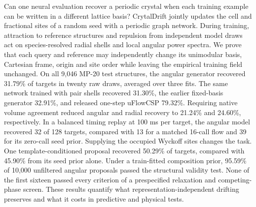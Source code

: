 Can one neural evaluation recover a periodic crystal when each training example can be written in a different lattice basis? CrytalDrift jointly updates the cell and fractional sites of a random seed with a periodic graph network. During training, attraction to reference structures and repulsion from independent model draws act on species-resolved radial shells and local angular power spectra. We prove that each query and reference may independently change its unimodular basis, Cartesian frame, origin and site order while leaving the empirical training field unchanged. On all 9,046 MP-20 test structures, the angular generator recovered 31.79\% of targets in twenty raw draws, averaged over three fits. The same network trained with pair shells recovered 31.30\%, the earlier fixed-basis generator 32.91\%, and released one-step uFlowCSP 79.32\%. Requiring native volume agreement reduced angular and radial recovery to 21.24\% and 24.60\%, respectively. In a balanced timing replay at 100 ms per target, the angular model recovered 32 of 128 targets, compared with 13 for a matched 16-call flow and 39 for its zero-call seed prior. Supplying the occupied Wyckoff sites changes the task. One template-conditioned proposal recovered 50.29\% of targets, compared with 45.90\% from its seed prior alone. Under a train-fitted composition prior, 95.59\% of 10,000 unfiltered angular proposals passed the structural validity test. None of the first sixteen passed every criterion of a prespecified relaxation and competing-phase screen. These results quantify what representation-independent drifting preserves and what it costs in predictive and physical tests.
